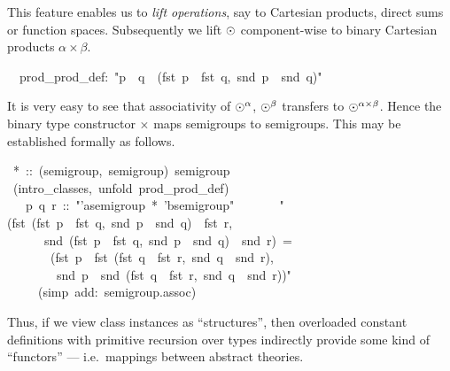 \begin{isabelle}
\begin{isamarkuptext}
 This feature enables us to \emph{lift operations}, say to Cartesian
 products, direct sums or function spaces.  Subsequently we lift
 $\odot$ component-wise to binary Cartesian products $\alpha \times
 \beta$.%
\end{isamarkuptext}%
\isanewline
~~prod\_prod\_def:~{"}p~{\isasymOtimes}~q~{\isasymequiv}~(fst~p~{\isasymOtimes}~fst~q,~snd~p~{\isasymOtimes}~snd~q){"}%
\begin{isamarkuptext}%
It is very easy to see that associativity of $\odot^\alpha$,
 $\odot^\beta$ transfers to ${\odot}^{\alpha \times \beta}$.  Hence
 the binary type constructor $\times$ maps semigroups to semigroups.
 This may be established formally as follows.%
\end{isamarkuptext}%
~*~::~(semigroup,~semigroup)~semigroup\isanewline
{}~(intro\_classes,~unfold~prod\_prod\_def)\isanewline
~~~p~q~r~::~{"}'a{\isasymColon}semigroup~*~'b{\isasymColon}semigroup{"}\isanewline
~~\isanewline
~~~~{"}(fst~(fst~p~{\isasymOtimes}~fst~q,~snd~p~{\isasymOtimes}~snd~q)~{\isasymOtimes}~fst~r,\isanewline
~~~~~~snd~(fst~p~{\isasymOtimes}~fst~q,~snd~p~{\isasymOtimes}~snd~q)~{\isasymOtimes}~snd~r)~=\isanewline
~~~~~~~(fst~p~{\isasymOtimes}~fst~(fst~q~{\isasymOtimes}~fst~r,~snd~q~{\isasymOtimes}~snd~r),\isanewline
~~~~~~~~snd~p~{\isasymOtimes}~snd~(fst~q~{\isasymOtimes}~fst~r,~snd~q~{\isasymOtimes}~snd~r)){"}\isanewline
~~~~~(simp~add:~semigroup.assoc)\isanewline
{}%
\begin{isamarkuptext}%
Thus, if we view class instances as ``structures'', then overloaded
 constant definitions with primitive recursion over types indirectly
 provide some kind of ``functors'' --- i.e.\ mappings between abstract
 theories.%
\end{isamarkuptext}%
\end{isabelle}%
